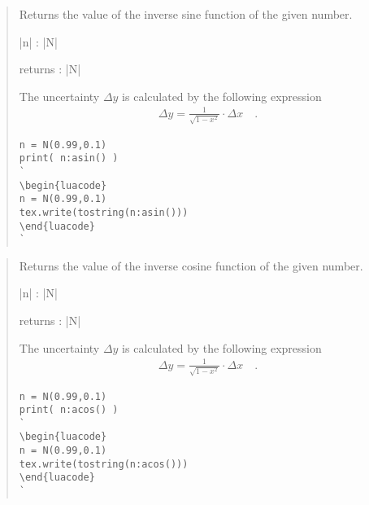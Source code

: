 \documentclass{ltxdoc}
\begin{document}
\begin{quote}
  Returns the value of the inverse sine function of the given number.

  \begin{description}
  \item |n| : |N|

  \item returns : |N|
  \end{description}

  The uncertainty $\Delta y$ is calculated by the following expression
  \begin{align*}
    \Delta y = \frac{1}{\sqrt{1 - x^2}} \cdot \Delta x \quad.
  \end{align*}


\begin{lstlisting}
n = N(0.99,0.1)
print( n:asin() )
`
\begin{luacode}
n = N(0.99,0.1)
tex.write(tostring(n:asin()))
\end{luacode}
`
\end{lstlisting}

\end{quote}


\begin{quote}
  Returns the value of the inverse cosine function of the given number.

  \begin{description}
  \item |n| : |N|

  \item returns : |N|
  \end{description}

  The uncertainty $\Delta y$ is calculated by the following expression
  \begin{align*}
    \Delta y = \frac{1}{\sqrt{1 - x^2}} \cdot \Delta x \quad.
  \end{align*}


\begin{lstlisting}
n = N(0.99,0.1)
print( n:acos() )
`
\begin{luacode}
n = N(0.99,0.1)
tex.write(tostring(n:acos()))
\end{luacode}
`
\end{lstlisting}

\end{quote}
\end{document}
